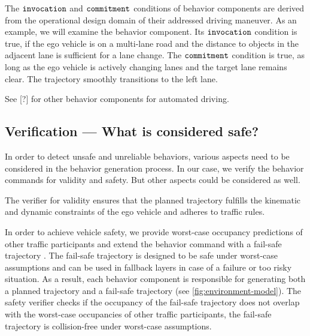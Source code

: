 The $\texttt{invocation}$ and $\texttt{commitment}$ conditions of behavior components are derived from the operational design domain of their addressed driving maneuver.
%
As an example, we will examine the  behavior component.
Its $\texttt{invocation}$ condition is true,
if the ego vehicle is on a multi-lane road and the distance to objects in the adjacent lane is sufficient for a lane change.
The $\texttt{commitment}$ condition is true, as long as the ego vehicle is actively changing lanes
and the target lane remains clear.
The trajectory smoothly transitions to the left lane.

See [?] for other behavior components for automated driving.






\subsection{Verification --- What is considered \textbf{safe}?}

In order to detect unsafe and unreliable behaviors,
various aspects need to be considered in the behavior generation process.
%
In our case, we verify the behavior commands for validity and safety.
But other aspects could be considered as well.

The verifier for validity ensures that the planned trajectory fulfills the kinematic and dynamic constraints of the ego vehicle
and adheres to traffic rules.

In order to achieve vehicle safety, we
provide worst-case occupancy predictions of other traffic participants
and extend the behavior command with a fail-safe trajectory \cite{althoff_set-based_2016}.
The fail-safe trajectory is designed to be safe under worst-case assumptions
and can be used in fallback layers in case of a failure or too risky situation.
As a result, each behavior component is responsible for generating both
a planned trajectory and a fail-safe trajectory (see \cref{fig:environment-model}).
The safety verifier checks if the occupancy of the fail-safe trajectory does not overlap
with the worst-case occupancies of other traffic participants,
\ie the fail-safe trajectory is collision-free under worst-case assumptions.



